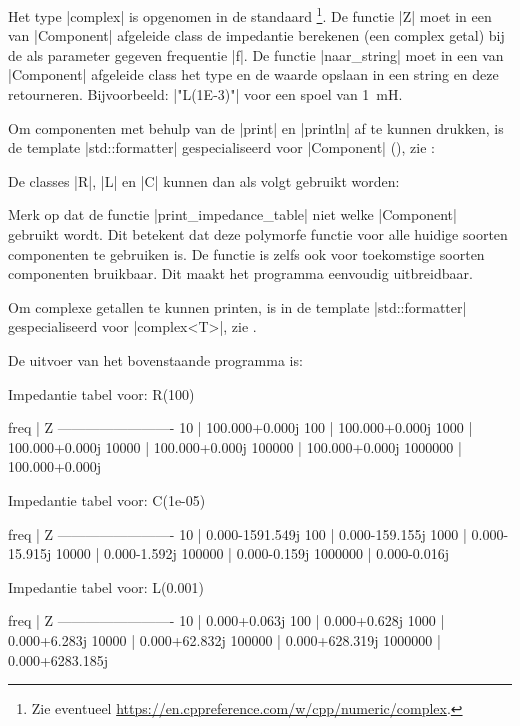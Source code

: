 \begin{cpplstShortInline}
Het type |complex| is opgenomen in de standaard \Cpp{} \footnote{%
	Zie eventueel \url{https://en.cppreference.com/w/cpp/numeric/complex}.
}. 
De functie |Z| moet in een van |Component| afgeleide class de impedantie berekenen (een complex getal) bij de als parameter gegeven frequentie |f|.
De functie |naar_string| moet in een van |Component| afgeleide class het type en de waarde opslaan in een string en deze retourneren.
Bijvoorbeeld: |"L(1E-3)"| voor een spoel van \SI{1}{\milli\henry}.

Om componenten met behulp van de |print| en |println| af te kunnen drukken, is de template |std::formatter| gespecialiseerd voor |Component| (), zie :

De classes |R|, |L| en |C| kunnen dan als volgt gebruikt worden:

Merk op dat de functie |print_impedance_table| niet  welke |Component| gebruikt wordt.
Dit betekent dat deze polymorfe functie voor alle huidige soorten componenten te gebruiken is.
De functie is zelfs ook voor toekomstige soorten componenten bruikbaar.
Dit maakt het programma eenvoudig uitbreidbaar.

Om complexe getallen te kunnen printen, is in  de template |std::formatter| gespecialiseerd voor |complex<T>|, zie .

De uitvoer van het bovenstaande programma is:
\begin{coutput}
Impedantie tabel voor: R(100)

   freq | Z
-------------------------
     10 | 100.000+0.000j
    100 | 100.000+0.000j
   1000 | 100.000+0.000j
  10000 | 100.000+0.000j
 100000 | 100.000+0.000j
1000000 | 100.000+0.000j

Impedantie tabel voor: C(1e-05)

   freq | Z
-------------------------
     10 | 0.000-1591.549j
    100 | 0.000-159.155j
   1000 | 0.000-15.915j
  10000 | 0.000-1.592j
 100000 | 0.000-0.159j
1000000 | 0.000-0.016j

Impedantie tabel voor: L(0.001)

   freq | Z
-------------------------
     10 | 0.000+0.063j
    100 | 0.000+0.628j
   1000 | 0.000+6.283j
  10000 | 0.000+62.832j
 100000 | 0.000+628.319j
1000000 | 0.000+6283.185j
\end{coutput}


\end{cpplstShortInline}
